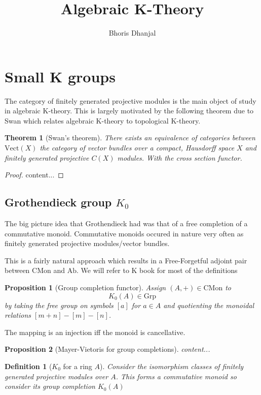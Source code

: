 \documentclass[12pt]{article}
\title{Algebraic K-Theory}
\author{Bhoris Dhanjal}
\numberwithin{equation}{section}
\newtheorem{theorem}{Theorem}[section]
\newtheorem{definition}{Definition}[section]
\newtheorem{proposition}{Proposition}[section]
\begin{document}
	\tableofcontents
	\maketitle
	\section{Small K groups}
	The category of finitely generated projective modules is the main object of study in algebraic K-theory. This is largely motivated by the following theorem due to Swan \cite{Swan1962} which relates algebraic K-theory to topological K-theory.
	\begin{theorem}[Swan's theorem]
		There exists an equivalence of categories between $\mathrm{Vect}(X)$ the category of vector bundles over a compact, Hausdorff space $X$ and finitely generated projective $C(X)$ modules. With the cross section functor.
	\end{theorem}
	\begin{proof}
		content...
	\end{proof}
	
	\subsection{Grothendieck group $K_0$}
	The big picture idea that Grothendieck had was that of a free completion of a commutative monoid. Commutative monoids occured in nature very often as finitely generated projective modules/vector bundles. 
	
	This is a fairly natural approach which results in a Free-Forgetful adjoint pair between $\mathrm{CMon}$ and $\mathrm{Ab}$. We will refer to K book for most of the definitions \cite{weibel2013k}
		
	\begin{proposition}[Group completion functor]
		Assign $(A,+) \in \mathrm{CMon} $ to \[K_0(A) \in \mathrm{Grp}\] by taking the free group on symbols $[a]$ for $a \in A$ and quotienting the monoidal relations $[m+n]-[m]-[n]$.
	\end{proposition}
	
	The mapping is an injection iff the monoid is cancellative.
	
	\begin{proposition}[Mayer-Vietoris for group completions]
		content...
	\end{proposition}
	
	\begin{definition}[$K_0$ for a ring $A$]
		Consider the isomorphism classes of finitely generated projective modules over $A$. This forms a commutative monoid so consider its group completion $K_0(A)$
	\end{definition}
	
\end{document}
